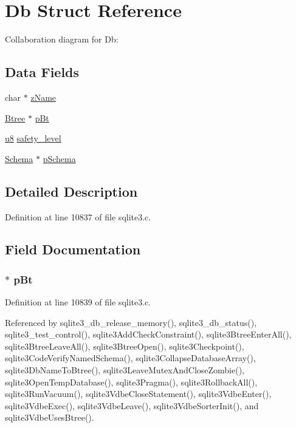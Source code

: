 \hypertarget{struct_db}{}\section{Db Struct Reference}
\label{struct_db}


Collaboration diagram for Db\+:
\subsection*{Data Fields}
\begin{DoxyCompactItemize}
\item 
char $\ast$ \hyperlink{struct_db_a661118d86ac4127d40bf3be78d92117d}{z\+Name}
\item 
\hyperlink{struct_btree}{Btree} $\ast$ \hyperlink{struct_db_aea9f10c5940febc27e109d5ec9f9d2af}{p\+Bt}
\item 
\hyperlink{sqlite3_8c_a74a0f6424ae628af25f23f0a35f6ead3}{u8} \hyperlink{struct_db_aec9729b84d983b099331a5ae74ee9864}{safety\+\_\+level}
\item 
\hyperlink{struct_schema}{Schema} $\ast$ \hyperlink{struct_db_ac262c2ca980f0326edbe82bbe7fda205}{p\+Schema}
\end{DoxyCompactItemize}


\subsection{Detailed Description}


Definition at line 10837 of file sqlite3.\+c.



\subsection{Field Documentation}
\hypertarget{struct_db_aea9f10c5940febc27e109d5ec9f9d2af}{}
\subsubsection[{p\+Bt}]{$\ast$ p\+Bt}\label{struct_db_aea9f10c5940febc27e109d5ec9f9d2af}


Definition at line 10839 of file sqlite3.\+c.



Referenced by sqlite3\+\_\+db\+\_\+release\+\_\+memory(), sqlite3\+\_\+db\+\_\+status(), sqlite3\+\_\+test\+\_\+control(), sqlite3\+Add\+Check\+Constraint(), sqlite3\+Btree\+Enter\+All(), sqlite3\+Btree\+Leave\+All(), sqlite3\+Btree\+Open(), sqlite3\+Checkpoint(), sqlite3\+Code\+Verify\+Named\+Schema(), sqlite3\+Collapse\+Database\+Array(), sqlite3\+Db\+Name\+To\+Btree(), sqlite3\+Leave\+Mutex\+And\+Close\+Zombie(), sqlite3\+Open\+Temp\+Database(), sqlite3\+Pragma(), sqlite3\+Rollback\+All(), sqlite3\+Run\+Vacuum(), sqlite3\+Vdbe\+Close\+Statement(), sqlite3\+Vdbe\+Enter(), sqlite3\+Vdbe\+Exec(), sqlite3\+Vdbe\+Leave(), sqlite3\+Vdbe\+Sorter\+Init(), and sqlite3\+Vdbe\+Uses\+Btree().

